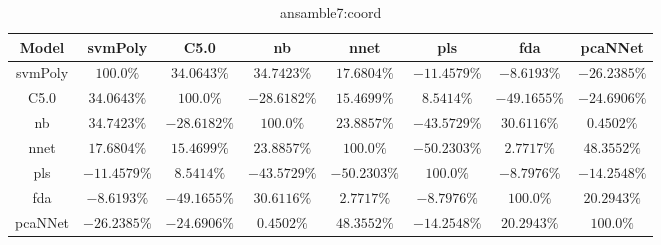 \begin{table}[!ht]
	\centering
	\begin{tabular}{|c|c|c|c|c|c|c|c|}
		\hline
		Model & svmPoly & C5.0 & nb & nnet & pls & fda & pcaNNet \\ \hline
		svmPoly & $100.0\%$ & $34.0643\%$ & $34.7423\%$ & $17.6804\%$ & $-11.4579\%$ & $-8.6193\%$ & $-26.2385\%$ \\ \hline
		C5.0 & $34.0643\%$ & $100.0\%$ & $-28.6182\%$ & $15.4699\%$ & $8.5414\%$ & $-49.1655\%$ & $-24.6906\%$ \\ \hline
		nb & $34.7423\%$ & $-28.6182\%$ & $100.0\%$ & $23.8857\%$ & $-43.5729\%$ & $30.6116\%$ & $0.4502\%$ \\ \hline
		nnet & $17.6804\%$ & $15.4699\%$ & $23.8857\%$ & $100.0\%$ & $-50.2303\%$ & $2.7717\%$ & $48.3552\%$ \\ \hline
		pls & $-11.4579\%$ & $8.5414\%$ & $-43.5729\%$ & $-50.2303\%$ & $100.0\%$ & $-8.7976\%$ & $-14.2548\%$ \\ \hline
		fda & $-8.6193\%$ & $-49.1655\%$ & $30.6116\%$ & $2.7717\%$ & $-8.7976\%$ & $100.0\%$ & $20.2943\%$ \\ \hline
		pcaNNet & $-26.2385\%$ & $-24.6906\%$ & $0.4502\%$ & $48.3552\%$ & $-14.2548\%$ & $20.2943\%$ & $100.0\%$ \\ \hline
	\end{tabular}
	\caption{ansamble7:coord}
	\label{tab:ansamble7:coord}
\end{table}

